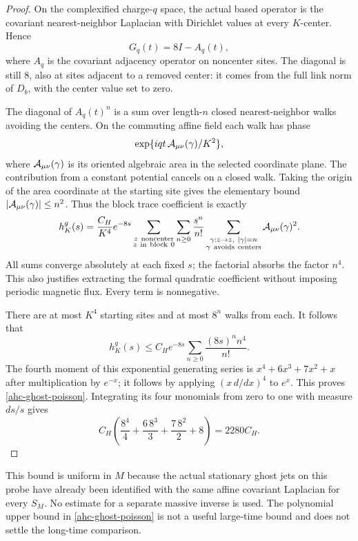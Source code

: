 \begin{proof}
On the complexified charge-\(q\) space, the actual based
operator is the covariant nearest-neighbor Laplacian
with Dirichlet values at every \(K\)-center. Hence
\[
 G_q(t)=8I-A_q(t),
\]
where \(A_q\) is the covariant adjacency operator on
noncenter sites. The diagonal is still \(8\), also
at sites adjacent to a removed center: it comes from
the full link norm of \(D_b\), with the center value
set to zero.

The diagonal of \(A_q(t)^n\) is a sum over length-\(n\)
closed nearest-neighbor walks avoiding the centers.
On the commuting affine field each walk has phase
\[
       \exp\{iqt\,{\cal A}_{\mu\nu}(\gamma)/K^2\},
\]
where \({\cal A}_{\mu\nu}(\gamma)\) is its oriented
algebraic area in the selected coordinate plane.
The contribution from a constant potential cancels
on a closed walk. Taking the origin of the area
coordinate at the starting site gives the elementary
bound \(|{\cal A}_{\mu\nu}(\gamma)|\le n^2\).
Thus the block trace coefficient is exactly
\begin{equation}
 h^g_K(s)=\frac{C_H}{K^4}e^{-8s}
   \sum_{\substack{z\ {\rm noncenter}\\z\ {\rm in\ block}\ 0}}
   \sum_{n\ge0}\frac{s^n}{n!}
   \sum_{\substack{\gamma:z\to z,\ |\gamma|=n\\
                    \gamma\ {\rm avoids\ centers}}}
                         {\cal A}_{\mu\nu}(\gamma)^2.
 \label{ahc-ghost-walk}
\end{equation}
All sums converge absolutely at each fixed \(s\);
the factorial absorbs the factor \(n^4\). This
also justifies extracting the formal quadratic
coefficient without imposing periodic magnetic flux.
Every term is nonnegative.

There are at most \(K^4\) starting sites and at most
\(8^n\) walks from each. It follows that
\[
 h^g_K(s)\le C_H e^{-8s}
                   \sum_{n\ge0}\frac{(8s)^n n^4}{n!}.
\]
The fourth moment of this exponential generating
series is \(x^4+6x^3+7x^2+x\) after multiplication
by \(e^{-x}\); it follows by applying
\((x\,d/dx)^4\) to \(e^x\). This proves
\eqref{ahc-ghost-poisson}. Integrating its four
monomials from zero to one with measure \(ds/s\)
gives
\[
 C_H\left(\frac{8^4}{4}
             +\frac{6\,8^3}{3}+\frac{7\,8^2}{2}+8\right)
                         =2280C_H.
\]
\end{proof}

This bound is uniform in \(M\) because the actual
stationary ghost jets on this probe have already
been identified with the same affine covariant
Laplacian for every \(S_M\). No estimate for a
separate massive inverse is used. The polynomial
upper bound in \eqref{ahc-ghost-poisson} is not a
useful large-time bound and does not settle the
long-time comparison.

